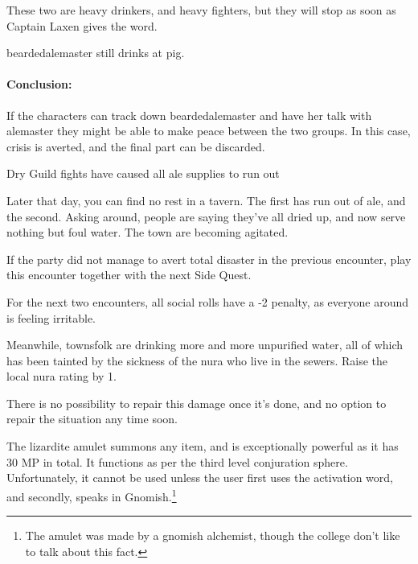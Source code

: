 \begin{multicols}{2}
These two are heavy drinkers, and heavy fighters, but they will stop as soon as Captain Laxen gives the word.


\Gls{beardedalemaster} still drinks at \gls{pig}.  

\paragraph{Conclusion:} If the characters can track down \gls{beardedalemaster} and have her talk with \gls{alemaster} they might be able to make peace between the two groups.
In this case, crisis is averted, and the final part can be discarded.

\beardedalemaster

{\N Dry}%
{Guild fights have caused all ale supplies to run out}%

\begin{boxtext}

	Later that day, you can find no rest in a tavern.  The first has run out of ale, and the second.  Asking around, people are saying they've all dried up, and now serve nothing but foul water.  The town are becoming agitated.

\end{boxtext}

If the party did not manage to avert total disaster in the previous encounter, play this encounter together with the next Side Quest.

For the next two encounters, all social rolls have a -2 penalty, as everyone around is feeling irritable.

Meanwhile, townsfolk are drinking more and more unpurified water, all of which has been tainted by the sickness of the nura who live in the sewers.  Raise the local nura rating by 1.

There is no possibility to repair this damage once it's done, and no option to repair the situation any time soon.

\stopcontents[sq]



\resumecontents[Villages]
\label{lizardite}
\stopcontents[Villages]

\startcontents[sq]

\sqminitoc

\noindent
The lizardite amulet summons any item, and is exceptionally powerful as it has 30 MP in total.  It functions as per the third level conjuration sphere.  Unfortunately, it cannot be used unless the user first uses the activation word, and secondly, speaks in Gnomish.\footnote{The amulet was made by a gnomish alchemist, though the college don't like to talk about this fact.}


\end{multicols}

